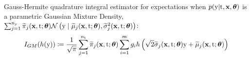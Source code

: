 \begin{definition}
\label{def:gh-mix-integral-estimator}
{\normalfont Gauss-Hermite quadrature integral estimator for expectations when $p(\mathrm{y} | \mathrm{t}, \mathbf{x}, \bm{\theta})$ is a parametric Gaussian Mixture Density, $\sum_{j=1}^{n_{\mathrm{y}}} \widetilde{\pi}_{j}(\mathbf{x}, \mathrm{t}; \bm{\theta}) \mathcal{N}\left(\mathrm{y} \mid \widetilde{\mu}_{j}(\mathbf{x}, \mathrm{t}; \bm{\theta}), \widetilde{\sigma}^{2}_j(\mathbf{x}, \mathrm{t}; \bm{\theta})\right)$:}
    \begin{equation*}
        I_{GM}(h(\mathrm{y})) \coloneqq \frac{1}{\sqrt{\pi}} \sum_{j=1}^{n_{\mathrm{t}}} \widetilde{\pi}_{j}(\mathbf{x}, \mathrm{t}; \bm{\theta}) \sum_{i=1}^{m} g_i h\left( \sqrt{2}\widetilde{\sigma}_j(\mathbf{x}, \mathrm{t}; \bm{\theta}) \mathrm{y} + \widetilde{\mu}_{j}(\mathbf{x}, \mathrm{t}; \bm{\theta}) \right)
    \end{equation*}
\end{definition}
